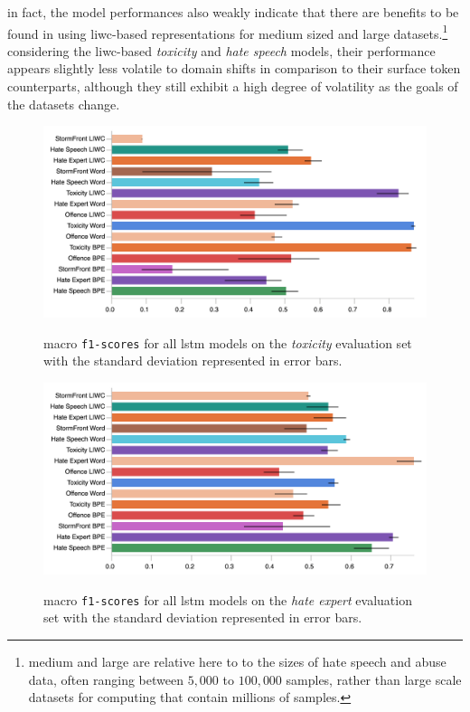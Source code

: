 in fact, the model performances also weakly indicate that there are benefits to be found in using liwc-based representations for medium sized and large datasets.\footnote{medium and large are relative here to to the sizes of hate speech and abuse data, often ranging between $5,000$ to $100,000$ samples, rather than large scale datasets for computing that contain millions of samples.}
considering the liwc-based \textit{toxicity} and \textit{hate speech} models, their performance appears slightly less volatile to domain shifts in comparison to their surface token counterparts, although they still exhibit a high degree of volatility as the goals of the datasets change.

\begin{figure}
\begin{minipage}{\textwidth}
    \centering
    \includegraphics[width=\textwidth]{all_lstm_wulczyn_test.pdf}
    \caption{macro \texttt{f1-scores} for all lstm models on the \textit{toxicity} evaluation set with the standard deviation represented in error bars.}
    \label{fig:wulczyn_lstm_test}
  \vfill
    \includegraphics[width=\textwidth]{all_lstm_waseem_test.pdf}
    \caption{macro \texttt{f1-scores} for all lstm models on the \textit{hate expert} evaluation set with the standard deviation represented in error bars.}
    \label{fig:waseem_lstm_test}
\end{minipage}
\end{figure}

